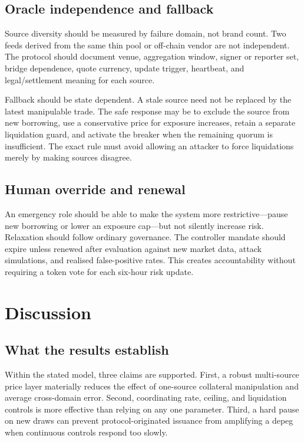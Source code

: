 \documentclass[sn-vancouver,Numbered]{sn-jnl}
\begin{document}
\subsection{Oracle independence and fallback}

Source diversity should be measured by failure domain, not brand count. Two feeds derived from the same thin pool or off-chain vendor are not independent. The protocol should document venue, aggregation window, signer or reporter set, bridge dependence, quote currency, update trigger, heartbeat, and legal/settlement meaning for each source.

Fallback should be state dependent. A stale source need not be replaced by the latest manipulable trade. The safe response may be to exclude the source from new borrowing, use a conservative price for exposure increases, retain a separate liquidation guard, and activate the breaker when the remaining quorum is insufficient. The exact rule must avoid allowing an attacker to force liquidations merely by making sources disagree.

\subsection{Human override and renewal}

An emergency role should be able to make the system more restrictive---pause new borrowing or lower an exposure cap---but not silently increase risk. Relaxation should follow ordinary governance. The controller mandate should expire unless renewed after evaluation against new market data, attack simulations, and realised false-positive rates. This creates accountability without requiring a token vote for each six-hour risk update.

\section{Discussion}\label{sec:discussion}

\subsection{What the results establish}

Within the stated model, three claims are supported. First, a robust multi-source price layer materially reduces the effect of one-source collateral manipulation and average cross-domain error. Second, coordinating rate, ceiling, and liquidation controls is more effective than relying on any one parameter. Third, a hard pause on new draws can prevent protocol-originated issuance from amplifying a depeg when continuous controls respond too slowly.
\end{document}
